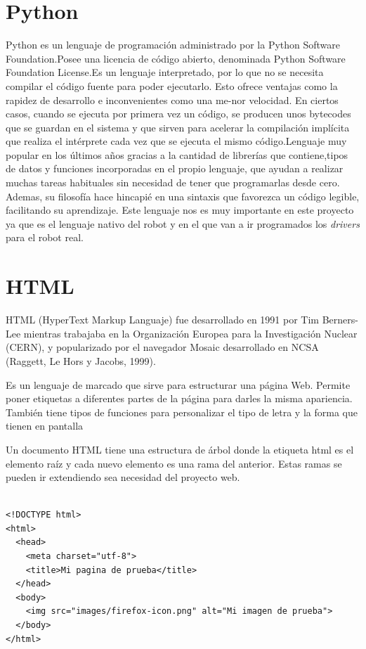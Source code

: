 \section{Python}

Python es un lenguaje de programación administrado por la Python Software Foundation.Posee una licencia de código abierto, denominada Python Software Foundation License.Es un lenguaje interpretado, por lo que no se necesita compilar el código fuente para poder ejecutarlo. Esto ofrece ventajas como la rapidez de desarrollo e inconvenientes como una me-nor velocidad. En ciertos casos, cuando se ejecuta por primera vez un código, se producen unos bytecodes que se guardan en el sistema y que sirven para acelerar la compilación implícita que realiza el intérprete cada vez que se ejecuta el mismo código.Lenguaje muy popular en los últimos años gracias a la cantidad de librerías que contiene,tipos de datos y funciones incorporadas en el propio lenguaje, que ayudan a realizar muchas tareas habituales sin necesidad de tener que programarlas desde cero. Ademas, su filosofía hace hincapié en una sintaxis que favorezca un código legible, facilitando su aprendizaje.
Este lenguaje nos es muy importante en este proyecto ya que es el lenguaje nativo del robot y en el que van a ir programados los \textit{drivers} para el robot real. 

\section{HTML}

HTML (HyperText Markup Languaje) fue desarrollado en 1991 por Tim Berners-Lee mientras trabajaba en la Organización Europea para la Investigación Nuclear (CERN), y popularizado por el navegador Mosaic desarrollado en NCSA (Raggett, Le Hors y Jacobs, 1999).

Es un lenguaje de marcado que sirve para estructurar una página Web. Permite poner etiquetas a diferentes partes de la página para darles la misma apariencia. También tiene tipos de funciones para personalizar el tipo de letra y la forma que tienen en pantalla

Un documento HTML tiene una estructura de árbol  donde la etiqueta html es el elemento raíz y cada nuevo elemento es una rama del anterior. Estas ramas se pueden ir extendiendo sea necesidad del proyecto web.

\begin{lstlisting}[frame=single,breaklines=true, label=Ejemplo de funcionamiento HTTP, caption=Ejemplo de funcionamiento HTTP, captionpos=b]

<!DOCTYPE html>
<html>
  <head>
    <meta charset="utf-8">
    <title>Mi pagina de prueba</title>
  </head>
  <body>
    <img src="images/firefox-icon.png" alt="Mi imagen de prueba">
  </body>
</html>
\end{lstlisting}

